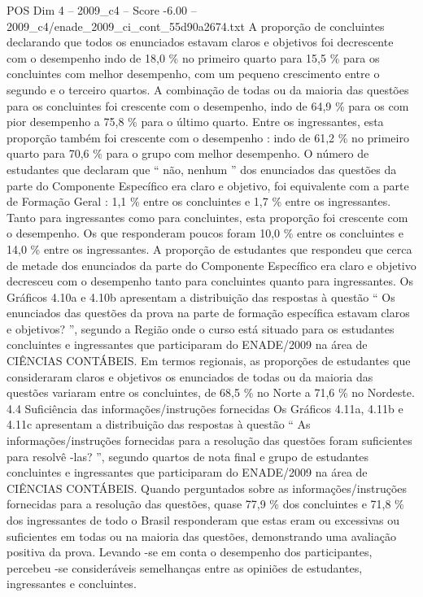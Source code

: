 \begin{textsample}{POS Dim 4 – 2009\_c4 – Score -6.00 – 2009\_c4/enade\_2009\_ci\_cont\_55d90a2674.txt}
A proporção de concluintes declarando que todos os enunciados estavam claros e objetivos foi decrescente com o desempenho indo de 18,0 \% no primeiro quarto para 15,5 \% para os concluintes com melhor desempenho, com um pequeno crescimento entre o segundo e o terceiro quartos.
A combinação de todas ou da maioria das questões para os concluintes foi crescente com o desempenho, indo de 64,9 \% para os com pior desempenho a 75,8 \% para o último quarto.
Entre os ingressantes, esta proporção também foi crescente com o desempenho : indo de 61,2 \% no primeiro quarto para 70,6 \% para o grupo com melhor desempenho.
O número de estudantes que declaram que “ não, nenhum ” dos enunciados das questões da parte do Componente Específico era claro e objetivo, foi equivalente com a parte de Formação Geral : 1,1 \% entre os concluintes e 1,7 \% entre os ingressantes.
Tanto para ingressantes como para concluintes, esta proporção foi crescente com o desempenho.
Os que responderam poucos foram 10,0 \% entre os concluintes e 14,0 \% entre os ingressantes.
A proporção de estudantes que respondeu que cerca de metade dos enunciados da parte do Componente Específico era claro e objetivo decresceu com o desempenho tanto para concluintes quanto para ingressantes.
Os Gráficos 4.10a e 4.10b apresentam a distribuição das respostas à questão “ Os enunciados das questões da prova na parte de formação específica estavam claros e objetivos? ”, segundo a Região onde o curso está situado para os estudantes concluintes e ingressantes que participaram do ENADE/2009 na área de CIÊNCIAS CONTÁBEIS.
Em termos regionais, as proporções de estudantes que consideraram claros e objetivos os enunciados de todas ou da maioria das questões variaram entre os concluintes, de 68,5 \% no Norte a 71,6 \% no Nordeste. 4.4 Suficiência das informações/instruções fornecidas Os Gráficos 4.11a, 4.11b e 4.11c apresentam a distribuição das respostas à questão “ As informações/instruções fornecidas para a resolução das questões foram suficientes para resolvê -las? ”, segundo quartos de nota final e grupo de estudantes concluintes e ingressantes que participaram do ENADE/2009 na área de CIÊNCIAS CONTÁBEIS.
Quando perguntados sobre as informações/instruções fornecidas para a resolução das questões, quase 77,9 \% dos concluintes e 71,8 \% dos ingressantes de todo o Brasil responderam que estas eram ou excessivas ou suficientes em todas ou na maioria das questões, demonstrando uma avaliação positiva da prova.
Levando -se em conta o desempenho dos participantes, percebeu -se consideráveis semelhanças entre as opiniões de estudantes, ingressantes e concluintes.

\end{textsample}
